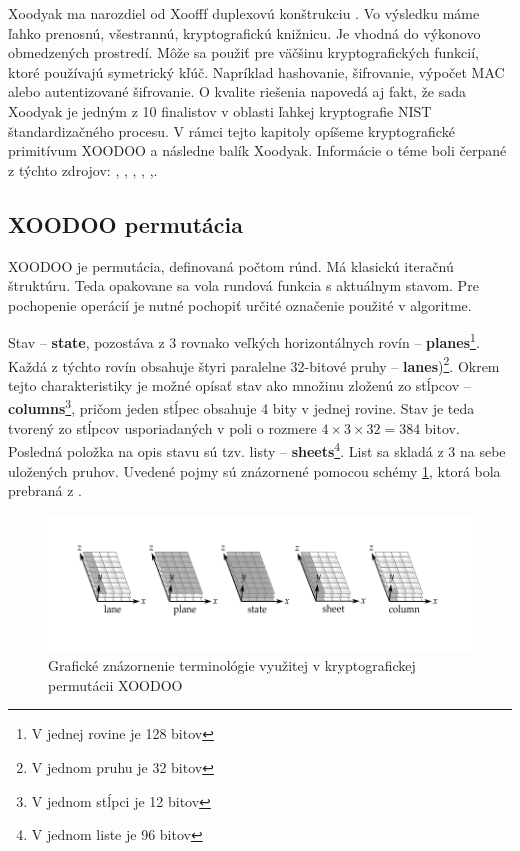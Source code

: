 Xoodyak ma narozdiel od Xoofff duplexovú konštrukciu \cite{duplex}. Vo výsledku máme ľahko prenosnú, všestrannú, kryptografickú knižnicu. Je vhodná do výkonovo obmedzených prostredí. Môže sa použiť pre väčšinu kryptografických funkcií, ktoré používajú symetrický kľúč. Napríklad hashovanie, šifrovanie, výpočet MAC alebo autentizované šifrovanie. O kvalite riešenia napovedá aj fakt, že sada Xoodyak je jedným z 10 finalistov v oblasti ľahkej kryptografie NIST štandardizačného procesu.
V rámci tejto kapitoly opíšeme kryptografické primitívum XOODOO a následne balík Xoodyak. Informácie o téme boli čerpané z týchto zdrojov: \cite{tkecak}, \cite{xd}, \cite{xcb}, \cite{xoodoocb}, \cite{xdupdate},\cite{xdr1}.
\subsection{XOODOO permutácia}
XOODOO je permutácia, definovaná počtom rúnd. Má klasickú iteračnú štruktúru. Teda opakovane sa vola rundová funkcia s aktuálnym stavom. Pre pochopenie operácií je nutné pochopiť určité označenie použité v algoritme.

Stav -- \textbf{state}, pozostáva z 3 rovnako veľkých horizontálnych rovín -- \textbf{planes}\footnote{V jednej rovine je 128 bitov}. Každá z týchto rovín obsahuje štyri paralelne 32-bitové pruhy -- \textbf{lanes})\footnote{V jednom pruhu je 32 bitov}. Okrem tejto charakteristiky je možné opísať stav ako množinu zloženú zo stĺpcov -- \textbf{columns}\footnote{V jednom stĺpci je 12 bitov}, pričom jeden stĺpec obsahuje 4 bity v jednej rovine. Stav je teda tvorený zo stĺpcov usporiadaných v poli o rozmere $4\times3\times32 = 384$ bitov. Posledná položka na opis stavu sú tzv. listy -- \textbf{sheets}\footnote{V jednom liste je 96 bitov}. List sa skladá z 3 na sebe uložených pruhov. Uvedené pojmy sú znázornené pomocou schémy \ref{xoodooterm}, ktorá bola prebraná z \cite{xcb}.

\begin{figure}[!h]
	\centering
	\includegraphics[width=1\textwidth]{figures/xoodooTerminology}
	\caption{Grafické znázornenie terminológie využitej v kryptografickej permutácii XOODOO \cite{xcb}}
	\label{xoodooterm}
\end{figure}

